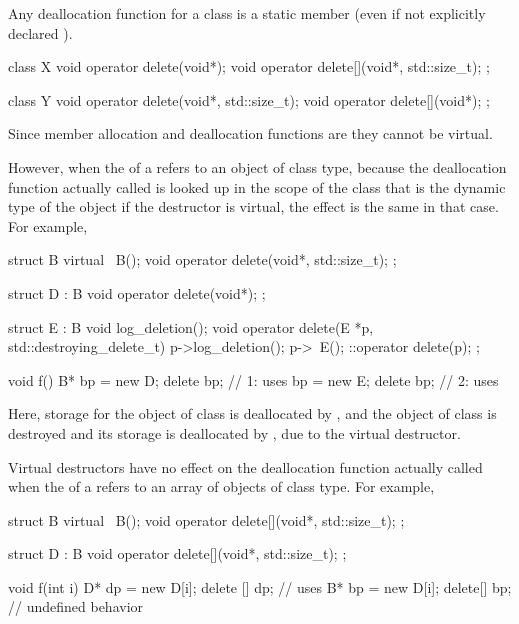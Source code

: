 \pnum
{}%
Any deallocation function for a class
is a static member (even if not explicitly declared
).
\begin{example}
\begin{codeblock}
class X {
  void operator delete(void*);
  void operator delete[](void*, std::size_t);
};

class Y {
  void operator delete(void*, std::size_t);
  void operator delete[](void*);
};
\end{codeblock}
\end{example}

\pnum
Since member allocation and deallocation functions are
they cannot be virtual.
\begin{note}
However, when the
of a
refers to an object of class type,
because the deallocation function actually called is looked up in the scope of
the class that is the dynamic type of the object
if the destructor is virtual, the effect is the same in that case.
For example,
\begin{codeblock}
struct B {
  virtual ~B();
  void operator delete(void*, std::size_t);
};

struct D : B {
  void operator delete(void*);
};

struct E : B {
  void log_deletion();
  void operator delete(E *p, std::destroying_delete_t) {
    p->log_deletion();
    p->~E();
    ::operator delete(p);
  }
};

void f() {
  B* bp = new D;
  delete bp;        // 1: uses 
  bp = new E;
  delete bp;        // 2: uses 
}
\end{codeblock}
Here, storage for the object of class
is deallocated by
,
and
the object of class  is destroyed
and its storage is deallocated
by ,
due to the virtual destructor.
\end{note}
\begin{note}
Virtual destructors have no effect on the deallocation function actually
called when the
of a
refers to an array of objects of class type.
For example,
\begin{codeblock}
struct B {
  virtual ~B();
  void operator delete[](void*, std::size_t);
};

struct D : B {
  void operator delete[](void*, std::size_t);
};

void f(int i) {
  D* dp = new D[i];
  delete [] dp;     // uses 
  B* bp = new D[i];
  delete[] bp;      // undefined behavior
}
\end{codeblock}
\end{note}

